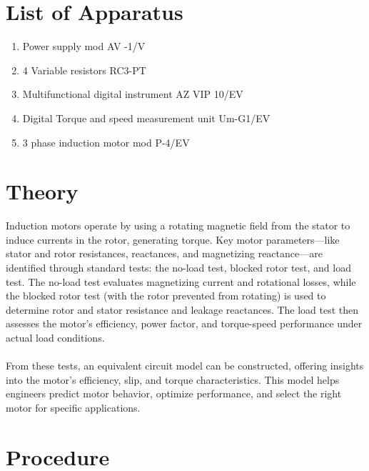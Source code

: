 \documentclass[12pt,a4paper]{report}
\begin{document}
\section{List of Apparatus}
\begin{enumerate}
    \item Power supply mod AV -1/V
    \item 4 Variable resistors RC3-PT
    \item Multifunctional digital instrument AZ VIP 10/EV 
    \item Digital Torque and speed measurement unit Um-G1/EV 
    \item 3 phase induction motor mod P-4/EV
\end{enumerate}

\section{Theory}
Induction motors operate by using a rotating magnetic field from the stator to induce currents in the rotor, generating torque. Key motor parameters—like stator and rotor resistances, reactances, and magnetizing reactance—are identified through standard tests: the no-load test, blocked rotor test, and load test. The no-load test evaluates magnetizing current and rotational losses, while the blocked rotor test (with the rotor prevented from rotating) is used to determine rotor and stator resistance and leakage reactances. The load test then assesses the motor’s efficiency, power factor, and torque-speed performance under actual load conditions.\\
\\
From these tests, an equivalent circuit model can be constructed, offering insights into the motor’s efficiency, slip, and torque characteristics. This model helps engineers predict motor behavior, optimize performance, and select the right motor for specific applications.

\section{Procedure}
\end{document}

